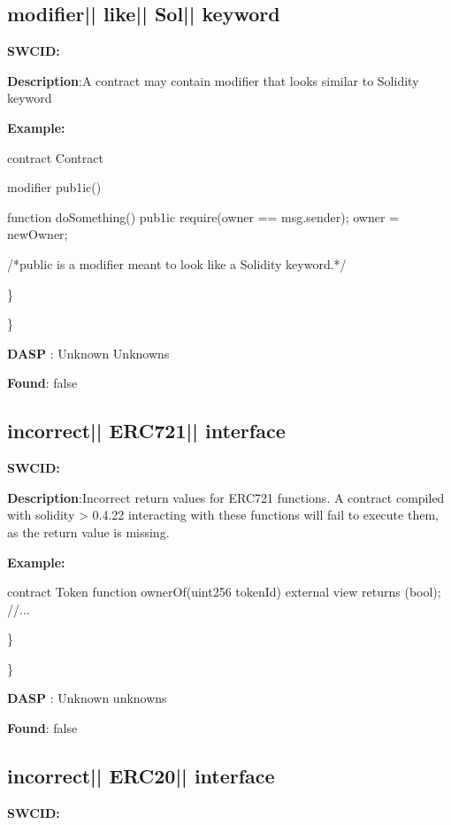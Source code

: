 \documentclass{article}
\begin{document}
\subsection{modifier{|\textunderscore| }like{|\textunderscore| }Sol{|\textunderscore| }keyword} 
\textbf{SWC{\textunderscore }ID:} 

\textbf{Description}:A contract may contain modifier that looks similar to Solidity keyword


\textbf{Example:} 
\begin{ffcode} 

contract Contract{
    modifier pub1ic() {
    }

    function doSomething() pub1ic {
        require(owner == msg.sender);
        owner = newOwner;
    }
}

 /*public is a modifier meant to look like a Solidity keyword.*/ 

\end{ffcode} 
\} 

\} 

\textbf{DASP} : Unknown Unknowns

\textbf{Found}: false

\subsection{incorrect{|\textunderscore| }ERC721{|\textunderscore| }interface} 
\textbf{SWC{\textunderscore }ID:} 

\textbf{Description}:Incorrect return values for ERC721 functions. A contract compiled with solidity > 0.4.22 interacting with these functions will fail to execute them, as the return value is missing.


\textbf{Example:} 
\begin{ffcode} 

contract Token{
    function ownerOf(uint256 \textunderscore tokenId) external view returns (bool);
    //...
}

\end{ffcode} 
\} 

\} 

\textbf{DASP} : Unknown unknowns

\textbf{Found}: false

\subsection{incorrect{|\textunderscore| }ERC20{|\textunderscore| }interface} 
\textbf{SWC{\textunderscore }ID:} 
\end{document}
